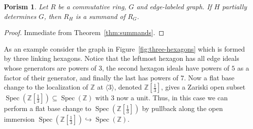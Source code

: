 \documentclass{article}
\newcommand{\Z}{\mathbb Z}
\DeclareMathOperator{\Spec}{Spec}
\newtheorem{porism}{Porism}
\begin{document}
\begin{porism}
\label{por:summand}
Let $R$ be a commutative ring, $G$ and edge-labeled graph. If $H$ partially determines $G$, then $R_H$ is a summand of $R_G$.
\end{porism}
\begin{proof}
Immediate from Theorem~\ref{thm:summands}.
\end{proof}

As an example consider the graph in Figure~\ref{fig:three-hexagons} which is formed by three linking hexagons. Notice that the leftmost hexagon has all edge ideals whose generators are powers of $3$, the second hexagon ideals have powers of $5$ as a factor of their generator, and finally the last has powers of $7$. Now a flat base change to the localization of $\Z$ at $\langle 3 \rangle$, denoted $\Z\!\left[\tfrac13\right]$, gives a Zariski open subset $\Spec(\Z[\frac{1}{3}]) \subseteq \Spec(\Z)$ with $3$ now a unit. Thus, in this case we can perform a flat base change to $\Spec(\Z[\frac{1}{3}])$ by pullback along the open immersion $\Spec(\Z[\frac{1}{3}]) \hookrightarrow \Spec(\Z)$.
\end{document}
